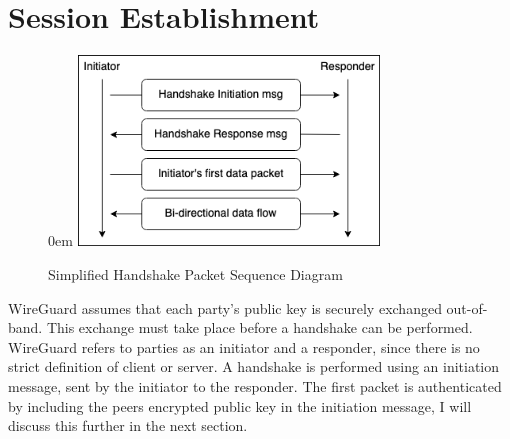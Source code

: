 \documentclass [11pt, proquest] {uwthesis}[2020/02/24]
\begin{document}
\section {Session Establishment}
\label{session_establish}
\begin{figure}
\centering
\itemsep0em 
\includegraphics[width=8cm]{paper/images/simp-handshake_process.png}
\caption{Simplified Handshake Packet Sequence Diagram }
\label{fig:simpleHandSeq}
\end{figure} 
WireGuard assumes that each party's public key is securely exchanged out-of-band. This exchange must take place before a handshake can be performed. 
WireGuard refers to parties as an initiator and a responder, since there is no strict definition of client or server. A handshake is performed using an initiation message, sent by the initiator to the responder. The first packet is authenticated by including the peers encrypted public key in the initiation message, I will discuss this further in the next section.
\end{document}
